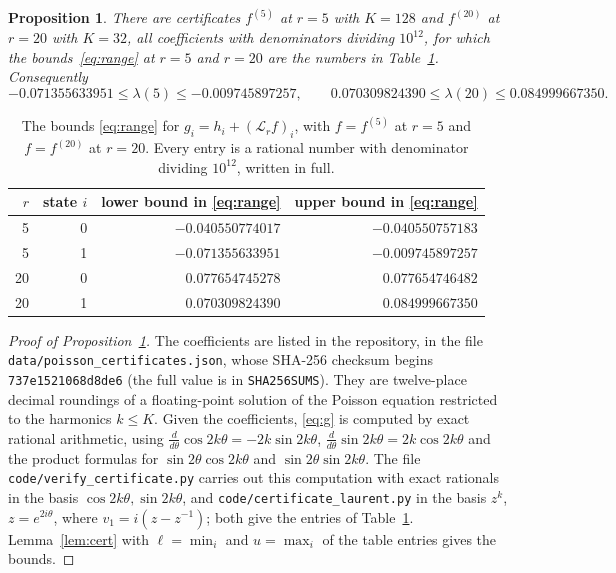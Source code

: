 \documentclass[11pt]{amsart}
\newtheorem{proposition}[theorem]{Proposition}
\newcommand{\cL}{\mathcal{L}}
\newcommand{\file}[1]{\nolinkurl{#1}}
\begin{document}
\begin{proposition}\label{prop:cert}
There are certificates $f^{(5)}$ at $r=5$ with $K=128$ and $f^{(20)}$ at $r=20$ with $K=32$, all coefficients with denominators dividing
$10^{12}$, for which the bounds~\eqref{eq:range} at $r=5$ and $r=20$ are the numbers in Table~\ref{tab:cert}.
Consequently
\[
-0.071355633951\le\lambda(5)\le-0.009745897257,\qquad 0.070309824390\le\lambda(20)\le0.084999667350 .
\]
\end{proposition}

\begin{table}[ht]
\centering
\begin{tabular}{@{}rrrr@{}}
\toprule
$r$ & state $i$ & lower bound in \eqref{eq:range} & upper bound in \eqref{eq:range}\\
\midrule
5 & 0 & $-0.040550774017$ & $-0.040550757183$\\
5 & 1 & $-0.071355633951$ & $-0.009745897257$\\
20 & 0 & $0.077654745278$ & $0.077654746482$\\
20 & 1 & $0.070309824390$ & $0.084999667350$\\
\bottomrule
\end{tabular}
\caption{The bounds \eqref{eq:range} for $g_i=h_i+(\cL_rf)_i$, with $f=f^{(5)}$ at $r=5$ and $f=f^{(20)}$ at $r=20$.
Every entry is a rational number with denominator dividing $10^{12}$, written in full.}\label{tab:cert}
\end{table}

\begin{proof}[Proof of Proposition~\ref{prop:cert}]
The coefficients are listed in the repository, in the file \file{data/poisson_certificates.json}, whose SHA-256
checksum begins \texttt{737e1521068d8de6} (the full value is in \file{SHA256SUMS}). They are
twelve-place decimal roundings of a floating-point solution of the Poisson equation restricted to the harmonics
$k\le K$. Given the coefficients, \eqref{eq:g} is computed by exact rational arithmetic, using
$\frac{d}{d\theta}\cos2k\theta=-2k\sin2k\theta$, $\frac{d}{d\theta}\sin2k\theta=2k\cos2k\theta$ and the product
formulas for $\sin2\theta\cos2k\theta$ and $\sin2\theta\sin2k\theta$. The file \file{code/verify_certificate.py}
carries out this computation with exact rationals in the basis $\cos2k\theta,\sin2k\theta$, and
\file{code/certificate_laurent.py} in the basis $z^k$, $z=e^{2i\theta}$, where $v_1=i(z-z^{-1})$; both give the
entries of Table~\ref{tab:cert}. Lemma~\ref{lem:cert} with $\ell=\min_i$ and $u=\max_i$ of the table entries gives the
bounds.
\end{proof}
\end{document}

